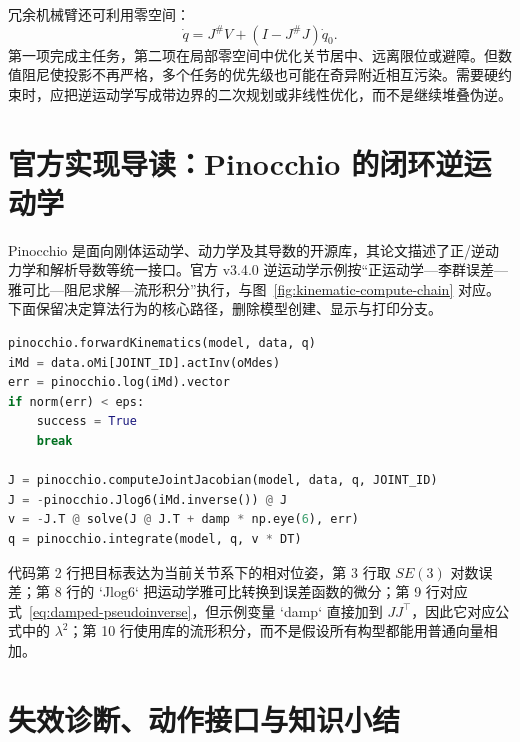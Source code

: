 冗余机械臂还可利用零空间：
\begin{equation}
\dot q=J^\#V+(I-J^\#J)\dot q_0.
\label{eq:nullspace-ik}
\end{equation}
第一项完成主任务，第二项在局部零空间中优化关节居中、远离限位或避障。但数值阻尼使投影不再严格，多个任务的优先级也可能在奇异附近相互污染。需要硬约束时，应把逆运动学写成带边界的二次规划或非线性优化，而不是继续堆叠伪逆。

\section{官方实现导读：Pinocchio 的闭环逆运动学}

Pinocchio 是面向刚体运动学、动力学及其导数的开源库，其论文描述了正/逆动力学和解析导数等统一接口\cite{carpentier2019pinocchio}。官方 v3.4.0 逆运动学示例按“正运动学—李群误差—雅可比—阻尼求解—流形积分”执行，与图~\ref{fig:kinematic-compute-chain} 对应\cite{pinocchio340ik}。下面保留决定算法行为的核心路径，删除模型创建、显示与打印分支。

\begin{lstlisting}[language=Python,caption={Pinocchio v3.4.0 闭环逆运动学核心路径（BSD-2-Clause；据官方示例节选）},label={lst:pinocchio-clik}]
pinocchio.forwardKinematics(model, data, q)
iMd = data.oMi[JOINT_ID].actInv(oMdes)
err = pinocchio.log(iMd).vector
if norm(err) < eps:
    success = True
    break

J = pinocchio.computeJointJacobian(model, data, q, JOINT_ID)
J = -pinocchio.Jlog6(iMd.inverse()) @ J
v = -J.T @ solve(J @ J.T + damp * np.eye(6), err)
q = pinocchio.integrate(model, q, v * DT)
\end{lstlisting}

代码第 2 行把目标表达为当前关节系下的相对位姿，第 3 行取 $SE(3)$ 对数误差；第 8 行的 `Jlog6` 把运动学雅可比转换到误差函数的微分；第 9 行对应式~\eqref{eq:damped-pseudoinverse}，但示例变量 `damp` 直接加到 $JJ^\top$，因此它对应公式中的 $\lambda^2$；第 10 行使用库的流形积分，而不是假设所有构型都能用普通向量相加。


\section{失效诊断、动作接口与知识小结}

